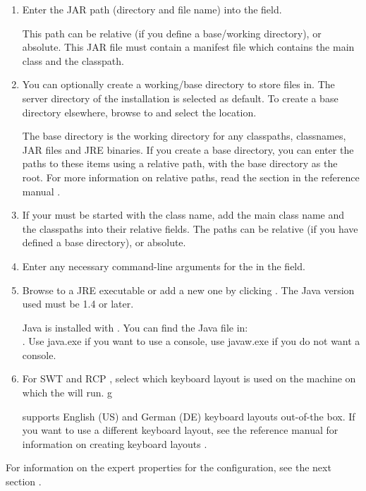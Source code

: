 \begin{enumerate}
\item Enter the JAR path (directory and file
  name) into the  field.  

This path can be relative (if you define a base/working directory), or absolute. This JAR file must contain a manifest file which contains the main class and the classpath. 

\item You can optionally create a working/base directory to store files in. The server directory of the \app{} installation is selected as default. To create a base directory elsewhere, browse to and select the location. 

The base directory is the working directory for any classpaths, classnames, JAR files and JRE binaries. If you create a base directory, you can enter the paths to these items using a relative path, with the base directory as the root. For more information on relative paths, read the section in the reference manual . 

\item If your \gdaut{} must be started with the class name, add the main class name and the classpaths into their relative fields. The paths can be relative (if you have defined a base directory), or absolute. 
\item Enter any necessary command-line arguments for the \gdaut{} in the
  field. 
\item Browse to a JRE executable or add a new one by clicking . 
The Java version used must be 1.4 or later. 

Java is installed with \app{}. You can find the Java file in:\\
.
Use java.exe if you want to use a console, use javaw.exe if you do not want a console. 
\item For SWT and RCP \gdauts{}, select which keyboard layout is used on the machine on which the \gdaut{} will run. 
g

\app{} supports English (US) and German (DE) keyboard layouts out-of-the box. If you want to use a different keyboard layout, see the reference manual for information on creating keyboard layouts . 
\end{enumerate}
For information on the expert properties for the \gdaut{} configuration, see the next section . 

